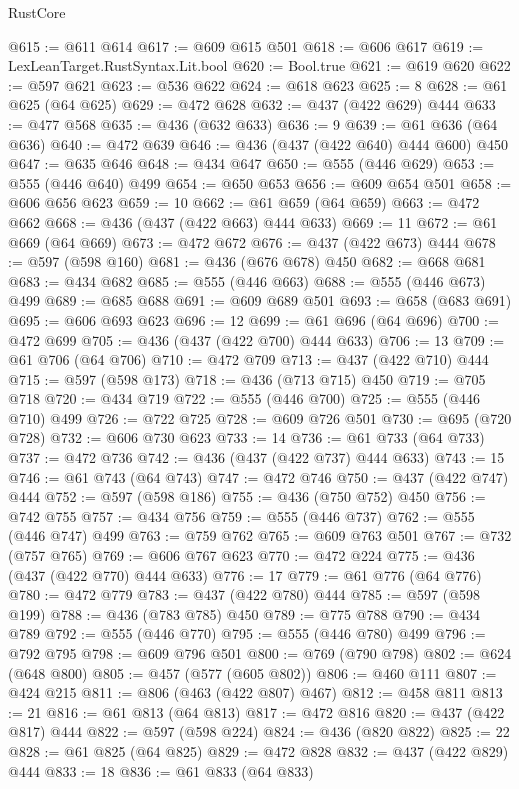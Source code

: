 \begin{lexlean}{RustCore}
\begin{coremodule}
@615 := @611 @614
@617 := @609 @615 @501
@618 := @606 @617
@619 := LexLeanTarget.RustSyntax.Lit.bool
@620 := Bool.true
@621 := @619 @620
@622 := @597 @621
@623 := @536 @622
@624 := @618 @623
@625 := 8
@628 := @61 @625 (@64 @625)
@629 := @472 @628
@632 := @437 (@422 @629) @444
@633 := @477 @568
@635 := @436 (@632 @633)
@636 := 9
@639 := @61 @636 (@64 @636)
@640 := @472 @639
@646 := @436 (@437 (@422 @640) @444 @600) @450
@647 := @635 @646
@648 := @434 @647
@650 := @555 (@446 @629)
@653 := @555 (@446 @640) @499
@654 := @650 @653
@656 := @609 @654 @501
@658 := @606 @656 @623
@659 := 10
@662 := @61 @659 (@64 @659)
@663 := @472 @662
@668 := @436 (@437 (@422 @663) @444 @633)
@669 := 11
@672 := @61 @669 (@64 @669)
@673 := @472 @672
@676 := @437 (@422 @673) @444
@678 := @597 (@598 @160)
@681 := @436 (@676 @678) @450
@682 := @668 @681
@683 := @434 @682
@685 := @555 (@446 @663)
@688 := @555 (@446 @673) @499
@689 := @685 @688
@691 := @609 @689 @501
@693 := @658 (@683 @691)
@695 := @606 @693 @623
@696 := 12
@699 := @61 @696 (@64 @696)
@700 := @472 @699
@705 := @436 (@437 (@422 @700) @444 @633)
@706 := 13
@709 := @61 @706 (@64 @706)
@710 := @472 @709
@713 := @437 (@422 @710) @444
@715 := @597 (@598 @173)
@718 := @436 (@713 @715) @450
@719 := @705 @718
@720 := @434 @719
@722 := @555 (@446 @700)
@725 := @555 (@446 @710) @499
@726 := @722 @725
@728 := @609 @726 @501
@730 := @695 (@720 @728)
@732 := @606 @730 @623
@733 := 14
@736 := @61 @733 (@64 @733)
@737 := @472 @736
@742 := @436 (@437 (@422 @737) @444 @633)
@743 := 15
@746 := @61 @743 (@64 @743)
@747 := @472 @746
@750 := @437 (@422 @747) @444
@752 := @597 (@598 @186)
@755 := @436 (@750 @752) @450
@756 := @742 @755
@757 := @434 @756
@759 := @555 (@446 @737)
@762 := @555 (@446 @747) @499
@763 := @759 @762
@765 := @609 @763 @501
@767 := @732 (@757 @765)
@769 := @606 @767 @623
@770 := @472 @224
@775 := @436 (@437 (@422 @770) @444 @633)
@776 := 17
@779 := @61 @776 (@64 @776)
@780 := @472 @779
@783 := @437 (@422 @780) @444
@785 := @597 (@598 @199)
@788 := @436 (@783 @785) @450
@789 := @775 @788
@790 := @434 @789
@792 := @555 (@446 @770)
@795 := @555 (@446 @780) @499
@796 := @792 @795
@798 := @609 @796 @501
@800 := @769 (@790 @798)
@802 := @624 (@648 @800)
@805 := @457 (@577 (@605 @802))
@806 := @460 @111
@807 := @424 @215
@811 := @806 (@463 (@422 @807) @467)
@812 := @458 @811
@813 := 21
@816 := @61 @813 (@64 @813)
@817 := @472 @816
@820 := @437 (@422 @817) @444
@822 := @597 (@598 @224)
@824 := @436 (@820 @822)
@825 := 22
@828 := @61 @825 (@64 @825)
@829 := @472 @828
@832 := @437 (@422 @829) @444
@833 := 18
@836 := @61 @833 (@64 @833)

\end{coremodule}
\end{lexlean}
